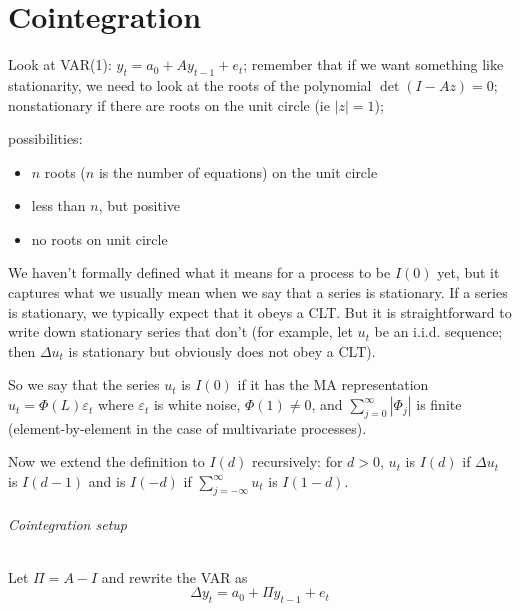 % 

\part*{Cointegration}

Look at VAR(1): $y_t = a_0 + A y_{t-1} + e_t$; remember that if we
want something like stationarity, we need to look at the roots of the
polynomial $\det(I - A z) = 0$; nonstationary if there are roots on
the unit circle (ie $|z| = 1$);

possibilities:
\begin{itemize}
\item $n$ roots ($n$ is the number of equations) on the unit circle
\item less than $n$, but positive
\item no roots on unit circle
\end{itemize}

We haven't formally defined what it means for a process to be $I(0)$
yet, but it captures what we usually mean when we say that a series is
stationary.  If a series is stationary, we typically expect that it
obeys a CLT.  But it is straightforward to write down stationary
series that don't (for example, let $u_t$ be an i.i.d. sequence; then
$Δu_t$ is stationary but obviously does not obey a CLT).

So we say that the series $u_t$ is $I(0)$ if it has the MA
representation $u_t = Φ(L) ε_t$ where $ε_t$ is white noise, $Φ(1) ≠
0$, and $∑_{j=0}^∞ | Φ_j |$ is finite (element-by-element in the case
of multivariate processes).

Now we extend the definition to $I(d)$ recursively: for $d > 0$, $u_t$
is $I(d)$ if $Δu_t$ is $I(d-1)$ and is $I(-d)$ if $∑_{j=-∞}^∞ u_t$ is
$I(1-d)$.

\paragraph{Cointegration setup}
Let $Π = A - I$ and rewrite the VAR as
\[Δ y_t = a_0 + Π y_{t-1} + e_t\]

